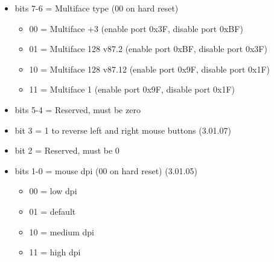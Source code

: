 \begin{itemize}
\item bits 7-6 = Multiface type (00 on hard reset)
  \begin{itemize}
  \item 00 = Multiface +3 (enable port 0x3F, disable port 0xBF)
  \item 01 = Multiface 128 v87.2 (enable port 0xBF, disable port 0x3F)
  \item 10 = Multiface 128 v87.12 (enable port 0x9F, disable port 0x1F)
  \item 11 = Multiface 1 (enable port 0x9F, disable port 0x1F)
  \end{itemize}
\item bits 5-4 = Reserved, must be zero
\item bit 3 = 1 to reverse left and right mouse buttons (3.01.07)
\item bit 2 = Reserved, must be 0
\item bits 1-0 = mouse dpi (00 on hard reset) (3.01.05)
  \begin{itemize}
  \item 00 = low dpi
  \item 01 = default
  \item 10 = medium dpi
  \item 11 = high dpi
  \end{itemize}
\end{itemize}

